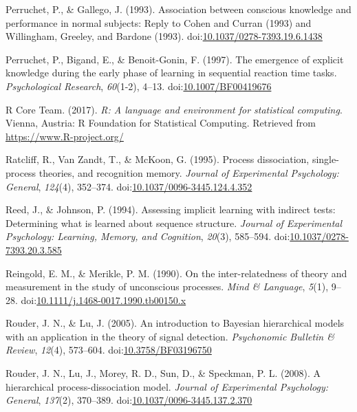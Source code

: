 \documentclass[floatsintext,doc]{apa6}
\theoremstyle{definition}
\theoremstyle{definition}
\theoremstyle{definition}
\theoremstyle{remark}
\begin{document}
\hypertarget{ref-perruchet_association_1993}{}
Perruchet, P., \& Gallego, J. (1993). Association between conscious
knowledge and performance in normal subjects: Reply to Cohen and Curran
(1993) and Willingham, Greeley, and Bardone (1993).
doi:\href{https://doi.org/10.1037/0278-7393.19.6.1438}{10.1037/0278-7393.19.6.1438}

\hypertarget{ref-perruchet_emergence_1997}{}
Perruchet, P., Bigand, E., \& Benoit-Gonin, F. (1997). The emergence of
explicit knowledge during the early phase of learning in sequential
reaction time tasks. \emph{Psychological Research}, \emph{60}(1-2),
4--13. doi:\href{https://doi.org/10.1007/BF00419676}{10.1007/BF00419676}

\hypertarget{ref-R-base}{}
R Core Team. (2017). \emph{R: A language and environment for statistical
computing}. Vienna, Austria: R Foundation for Statistical Computing.
Retrieved from \url{https://www.R-project.org/}

\hypertarget{ref-ratcliff_process_1995}{}
Ratcliff, R., Van Zandt, T., \& McKoon, G. (1995). Process dissociation,
single-process theories, and recognition memory. \emph{Journal of
Experimental Psychology: General}, \emph{124}(4), 352--374.
doi:\href{https://doi.org/10.1037/0096-3445.124.4.352}{10.1037/0096-3445.124.4.352}

\hypertarget{ref-reed_assessing_1994}{}
Reed, J., \& Johnson, P. (1994). Assessing implicit learning with
indirect tests: Determining what is learned about sequence structure.
\emph{Journal of Experimental Psychology: Learning, Memory, and
Cognition}, \emph{20}(3), 585--594.
doi:\href{https://doi.org/10.1037/0278-7393.20.3.585}{10.1037/0278-7393.20.3.585}

\hypertarget{ref-reingold_inter-relatedness_1990}{}
Reingold, E. M., \& Merikle, P. M. (1990). On the inter-relatedness of
theory and measurement in the study of unconscious processes. \emph{Mind
\& Language}, \emph{5}(1), 9--28.
doi:\href{https://doi.org/10.1111/j.1468-0017.1990.tb00150.x}{10.1111/j.1468-0017.1990.tb00150.x}

\hypertarget{ref-rouder_introduction_2005}{}
Rouder, J. N., \& Lu, J. (2005). An introduction to Bayesian
hierarchical models with an application in the theory of signal
detection. \emph{Psychonomic Bulletin \& Review}, \emph{12}(4),
573--604.
doi:\href{https://doi.org/10.3758/BF03196750}{10.3758/BF03196750}

\hypertarget{ref-rouder_hierarchical_2008}{}
Rouder, J. N., Lu, J., Morey, R. D., Sun, D., \& Speckman, P. L. (2008).
A hierarchical process-dissociation model. \emph{Journal of Experimental
Psychology: General}, \emph{137}(2), 370--389.
doi:\href{https://doi.org/10.1037/0096-3445.137.2.370}{10.1037/0096-3445.137.2.370}
\end{document}
